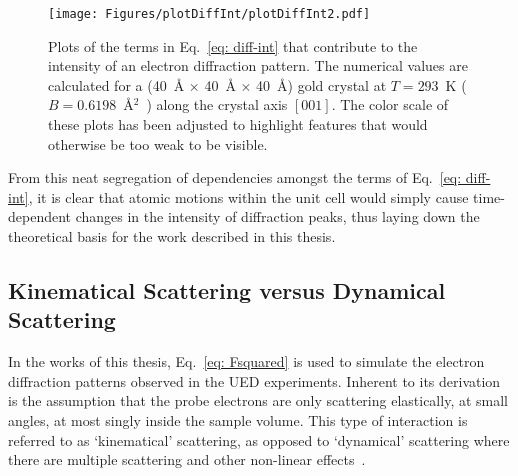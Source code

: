\begin{figure}[t!]
  \centering
  \texttt{[image: Figures/plotDiffInt/plotDiffInt2.pdf]}
  \caption[Plots of the terms that contribute to the intensity of an electron diffraction pattern.]{
    Plots of the terms in Eq.~\eqref{eq: diff-int}
    that contribute to the intensity of an electron diffraction pattern.
    The numerical values are calculated
    for a (40~\AA{} $\times$ 40~\AA{} $\times$ 40~\AA{}) gold crystal
    at $T = 293$~K ($B = 0.6198$~\AA$^2$~\cite{Peng1996})
    along the crystal axis $\left[ 0 0 1 \right]$.
    The color scale of these plots has been adjusted to highlight features
    that would otherwise be too weak to be visible.
  }
  \label{fig: plotDiffInt}
\end{figure}

From this neat segregation of dependencies amongst the terms
of Eq.~\eqref{eq: diff-int},
it is clear that atomic motions within the unit cell
would simply cause time-dependent changes in the intensity
of diffraction peaks, thus laying down the theoretical basis
for the work described in this thesis.

\subsection{Kinematical Scattering versus Dynamical Scattering}
\label{sec: kinematical-vs-dynamical}

In the works of this thesis, Eq.~\eqref{eq: Fsquared} is used to simulate
the electron diffraction patterns observed in the UED experiments.
Inherent to its derivation is the assumption that
the probe electrons are only scattering elastically, at small angles,
at most singly inside the sample volume.
This type of interaction is referred to as `kinematical' scattering,
as opposed to `dynamical' scattering where there are multiple scattering
and other non-linear effects~\cite{CowleyBook, ReimerBook, KirklandBook, Clabbers2018}.

